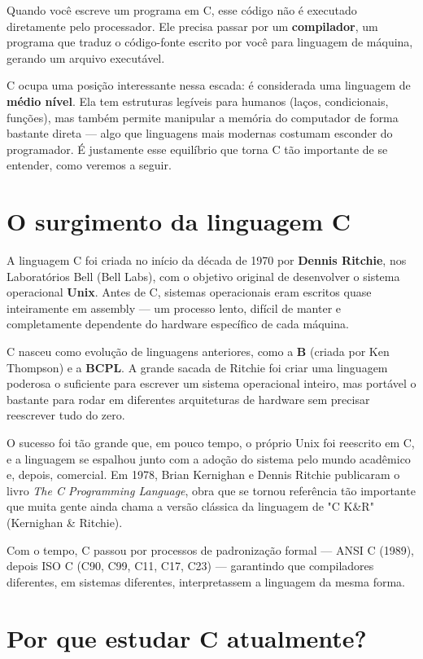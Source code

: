 \documentclass[12pt,a4paper,oneside]{extreport}
\begin{document}
Quando você escreve um programa em C, esse código não é executado diretamente pelo processador. Ele precisa passar por um \textbf{compilador}, um programa que traduz o código-fonte escrito por você para linguagem de máquina, gerando um arquivo executável.

C ocupa uma posição interessante nessa escada: é considerada uma linguagem de \textbf{médio nível}. Ela tem estruturas legíveis para humanos (laços, condicionais, funções), mas também permite manipular a memória do computador de forma bastante direta — algo que linguagens mais modernas costumam esconder do programador. É justamente esse equilíbrio que torna C tão importante de se entender, como veremos a seguir.


\section{O surgimento da linguagem C}

A linguagem C foi criada no início da década de 1970 por \textbf{Dennis Ritchie}, nos Laboratórios Bell (Bell Labs), com o objetivo original de desenvolver o sistema operacional \textbf{Unix}. Antes de C, sistemas operacionais eram escritos quase inteiramente em assembly — um processo lento, difícil de manter e completamente dependente do hardware específico de cada máquina.

C nasceu como evolução de linguagens anteriores, como a \textbf{B} (criada por Ken Thompson) e a \textbf{BCPL}. A grande sacada de Ritchie foi criar uma linguagem poderosa o suficiente para escrever um sistema operacional inteiro, mas portável o bastante para rodar em diferentes arquiteturas de hardware sem precisar reescrever tudo do zero.

O sucesso foi tão grande que, em pouco tempo, o próprio Unix foi reescrito em C, e a linguagem se espalhou junto com a adoção do sistema pelo mundo acadêmico e, depois, comercial. Em 1978, Brian Kernighan e Dennis Ritchie publicaram o livro \textit{The C Programming Language}, obra que se tornou referência tão importante que muita gente ainda chama a versão clássica da linguagem de "C K\&R" (Kernighan \& Ritchie).

Com o tempo, C passou por processos de padronização formal — ANSI C (1989), depois ISO C (C90, C99, C11, C17, C23) — garantindo que compiladores diferentes, em sistemas diferentes, interpretassem a linguagem da mesma forma.

\section{Por que estudar C atualmente?}
\end{document}
